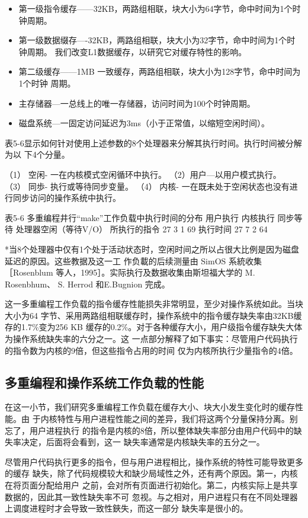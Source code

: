 \begin{itemize}
    \item 第一级指令缓存——32KB，两路组相联，块大小为64字节，命中时间为1个时钟周期。
    \item 第一级数据缀存—-32KB，两路组相联，块大小为32字节，命中时间为1个时钟周期。
    我们改变L1数据缓存，以研究它对缓存特性的影响。
    \item 第二级缓存——1MB 一致缓存，两路组相联，块大小为128字节，命中时间为1个时钟
    周期。
    \item 主存储器—一总线上的唯一存储器，访问时间为100个时钟周期。
    \item 磁盘系统—一固定访问延迟为3ms（小于正常值，以缩短空闲时间）。
\end{itemize}
表5-6显示如何针对使用上述参数的8个处理器来分解其执行时间。执行时间被分解为以
下4个分量。

（1） 空闲-
一在内核模式空闲循环中执行。
（2）用户—以用户模式执行。
（3） 同歩-
执行或等待同步变量。
（4） 内核-
一在既未处于空闲状态也没有进行同步访问的操作系统中执行。

表5-6 多重编程井行“make”工作负载中执行时间的分布
用户执行
内核执行
同步等待
处理器空闲（等待V/O）
所执行的指令
27%
3%
1%
69%
执行时间
27%
7%
2%
64%

*当8个处理器中仅有1个处于活动状态时，空闲时间之所以占很大比例是因为磁盘延迟的原因。这些教据及这一工
作负載的后续测量由 SimOS 系統收集［Rosenblum 等人，1995］。实际执行及数据收集由斯坦福大学的 M. Rosenbhum、
S. Herrod 和E.Bugnion 完成。

这一多重编程工作负载的指令缓存性能损失非常明显，至少对操作系统如此。当块大小为64
字节、采用两路组相联缓存时，操作系统中的指令缓存缺失率由32KB缓存的1.7\%变为256 KB
缓存的0.2\%。对于各种缓存大小，用户级指令缓存缺失大体为操作系统缺失率的六分之一。这
一点部分解释了如下事实：尽管用户代码执行的指令数为内核的9倍，但这些指令占用的时间
仅为内核所执行少量指令的4倍。

\subsection{多重编程和操作系统工作负载的性能}
在这一小节，我们研究多重编程工作负载在缓存大小、块大小发生变化时的缓存性能。由
于内核特性与用户进程性能之间的差异，我们将这两个分量保持分离。别忘了，用户进程执行
的指令是内核的8倍，所以整体缺失率部分由用户代码中的缺失率决定，后面将会看到，这一
缺失率通常是内核缺失率的五分之一。

尽管用户代码执行更多的指令，但与用户进程相比，操作系统的特性可能导致更多的缓存
缺失，除了代码规模较大和缺少局域性之外，还有两个原因。第一，内核在将页面分配给用户
之前，会对所有页面进行初始化。第二，内核实际上是共享数据的，因此其一致性缺失率不可
忽视。与之相对，用户进程只有在不同处理器上调度进程时才会导致一致性鋏失，而这一部分
缺失率是很小的。

